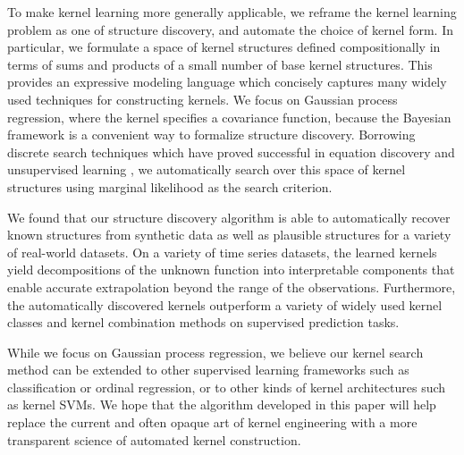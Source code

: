 \documentclass[twoside]{article}
\begin{document}
To make kernel learning more generally applicable, we reframe the kernel learning problem as one of structure discovery, and automate the choice of kernel form.
In particular, we formulate a space of kernel structures defined compositionally in terms of sums and products of a small number of base kernel structures.
This provides an expressive modeling language which concisely captures many widely used techniques for constructing kernels.
We focus on Gaussian process regression, where the kernel specifies a covariance function, because the Bayesian framework is a convenient way to formalize structure discovery.
Borrowing discrete search techniques which have proved successful in equation discovery \cite{todorovski1997declarative} and unsupervised learning \cite{grosse2012exploiting}, we automatically search over this space of kernel structures using marginal likelihood as the search criterion.

We found that our structure discovery algorithm is able to automatically recover known structures from synthetic data as well as plausible structures for a variety of real-world datasets. 
On a variety of time series datasets, the learned kernels yield decompositions of the unknown function into interpretable components that enable accurate extrapolation beyond the range of the observations.
Furthermore, the automatically discovered kernels outperform a variety of widely used kernel classes and kernel combination methods on supervised prediction tasks.


While we focus on Gaussian process regression, we believe our kernel search method can be extended to other supervised learning frameworks such as classification or ordinal regression, or to other kinds of kernel architectures such as kernel SVMs.
We hope that the algorithm developed in this paper will help replace the current and often opaque art of kernel engineering with a more transparent science of automated kernel construction.
\end{document}
